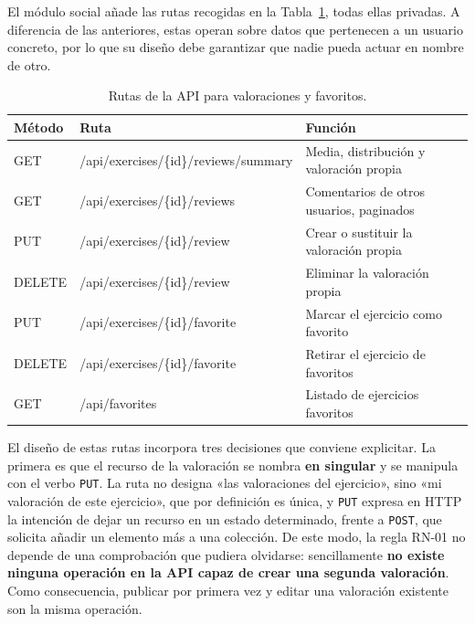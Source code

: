 \documentclass[12pt,a4paper,twoside,openright]{book}
\begin{document}
    El módulo social añade las rutas recogidas en la
    Tabla~\ref{tab:api-social}, todas ellas privadas. A diferencia de las
    anteriores, estas operan sobre datos que pertenecen a un usuario concreto,
    por lo que su diseño debe garantizar que nadie pueda actuar en nombre de
    otro.

    \begin{table}[htbp]
        \centering
        \begin{tabular}{ll p{6cm}}
            \toprule
            \textbf{Método} & \textbf{Ruta} & \textbf{Función} \\
            \midrule
            GET    & /api/exercises/\{id\}/reviews/summary & Media, distribución y valoración propia \\
            GET    & /api/exercises/\{id\}/reviews         & Comentarios de otros usuarios, paginados \\
            PUT    & /api/exercises/\{id\}/review          & Crear o sustituir la valoración propia \\
            DELETE & /api/exercises/\{id\}/review          & Eliminar la valoración propia \\
            PUT    & /api/exercises/\{id\}/favorite        & Marcar el ejercicio como favorito \\
            DELETE & /api/exercises/\{id\}/favorite        & Retirar el ejercicio de favoritos \\
            GET    & /api/favorites                        & Listado de ejercicios favoritos \\
            \bottomrule
        \end{tabular}
        \caption{Rutas de la API para valoraciones y favoritos.}
        \label{tab:api-social}
    \end{table}

    El diseño de estas rutas incorpora tres decisiones que conviene explicitar. La 
    primera es que el recurso de la valoración se nombra \textbf{en
    singular} y se manipula con el verbo \texttt{PUT}. La ruta no designa «las
    valoraciones del ejercicio», sino «mi valoración de este ejercicio», que
    por definición es única, y \texttt{PUT} expresa en HTTP la intención de
    dejar un recurso en un estado determinado, frente a \texttt{POST}, que
    solicita añadir un elemento más a una colección. De este modo, la regla
    RN-01 no depende de una comprobación que pudiera olvidarse: sencillamente
    \textbf{no existe ninguna operación en la API capaz de crear una segunda
    valoración}. Como consecuencia, publicar por primera vez y editar una
    valoración existente son la misma operación.
\end{document}
